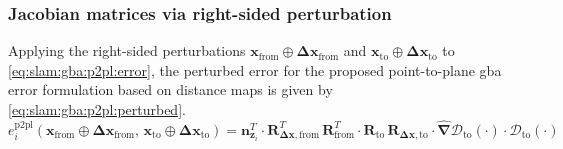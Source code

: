 \subsubsection{Jacobian matrices via right-sided perturbation}
\label{sec:slam:gba:p2pl:jacobian}

Applying the right-sided perturbations
$\mathbf{x}_{\mathrm{from}}\oplus\mathbf{\Delta x}_{\mathrm{from}}$ and
$\mathbf{x}_{\mathrm{to}}\oplus\mathbf{\Delta x}_{\mathrm{to}}$ to
\eqref{eq:slam:gba:p2pl:error}, the perturbed error for the proposed
point-to-plane \gls{gba} error formulation based on distance maps is given by
\eqref{eq:slam:gba:p2pl:perturbed}.
\begin{equation}
\label{eq:slam:gba:p2pl:perturbed}
e_i^{\mathrm{p2pl}}\!\left(\mathbf{x}_{\mathrm{from}}\oplus\mathbf{\Delta x}_{\mathrm{from}},\,
                           \mathbf{x}_{\mathrm{to}}\oplus\mathbf{\Delta x}_{\mathrm{to}}\right) =
\mathbf{n}_{\mathbf{z}_i}^T \cdot
\mathbf{R}_{\mathbf{\Delta x},\mathrm{from}}^T \,
\mathbf{R}_{\mathrm{from}}^T \cdot
\mathbf{R}_{\mathrm{to}} \,
\mathbf{R}_{\mathbf{\Delta x},\mathrm{to}} \cdot
\hat{\bm{\nabla}}\mathcal{D}_{\mathrm{to}}\!\left(\cdot\right)\cdot
\mathcal{D}_{\mathrm{to}}\!\left(\cdot\right)
\end{equation}


